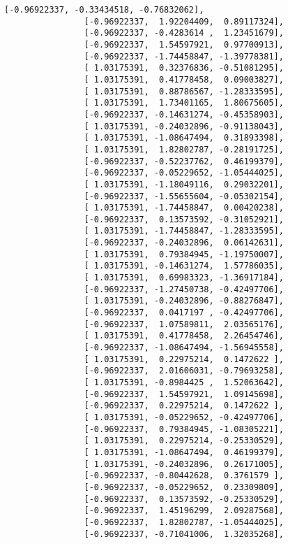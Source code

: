 \documentclass[11pt]{article}
\begin{document}
\begin{Verbatim}[commandchars=\\\{\}]
                [-0.96922337, -0.33434518, -0.76832062],
                [-0.96922337,  1.92204409,  0.89117324],
                [-0.96922337, -0.4283614 ,  1.23451679],
                [-0.96922337,  1.54597921,  0.97700913],
                [-0.96922337, -1.74458847, -1.39778381],
                [ 1.03175391,  0.32376836, -0.51081295],
                [ 1.03175391,  0.41778458,  0.09003827],
                [ 1.03175391,  0.88786567, -1.28333595],
                [ 1.03175391,  1.73401165,  1.80675605],
                [-0.96922337, -0.14631274, -0.45358903],
                [ 1.03175391, -0.24032896, -0.91138043],
                [ 1.03175391, -1.08647494,  0.31893398],
                [ 1.03175391,  1.82802787, -0.28191725],
                [-0.96922337, -0.52237762,  0.46199379],
                [-0.96922337, -0.05229652, -1.05444025],
                [ 1.03175391, -1.18049116,  0.29032201],
                [-0.96922337, -1.55655604, -0.05302154],
                [ 1.03175391, -1.74458847,  0.00420238],
                [-0.96922337,  0.13573592, -0.31052921],
                [ 1.03175391, -1.74458847, -1.28333595],
                [-0.96922337, -0.24032896,  0.06142631],
                [ 1.03175391,  0.79384945, -1.19750007],
                [ 1.03175391, -0.14631274,  1.57786035],
                [ 1.03175391,  0.69983323, -1.36917184],
                [-0.96922337, -1.27450738, -0.42497706],
                [ 1.03175391, -0.24032896, -0.88276847],
                [-0.96922337,  0.0417197 , -0.42497706],
                [-0.96922337,  1.07589811,  2.03565176],
                [ 1.03175391,  0.41778458,  2.26454746],
                [-0.96922337, -1.08647494, -1.56945558],
                [ 1.03175391,  0.22975214,  0.1472622 ],
                [-0.96922337,  2.01606031, -0.79693258],
                [ 1.03175391, -0.8984425 ,  1.52063642],
                [-0.96922337,  1.54597921,  1.09145698],
                [-0.96922337,  0.22975214,  0.1472622 ],
                [ 1.03175391, -0.05229652, -0.42497706],
                [-0.96922337,  0.79384945, -1.08305221],
                [ 1.03175391,  0.22975214, -0.25330529],
                [ 1.03175391, -1.08647494,  0.46199379],
                [ 1.03175391, -0.24032896,  0.26171005],
                [-0.96922337, -0.80442628,  0.3761579 ],
                [-0.96922337, -0.05229652,  0.23309809],
                [-0.96922337,  0.13573592, -0.25330529],
                [-0.96922337,  1.45196299,  2.09287568],
                [-0.96922337,  1.82802787, -1.05444025],
                [-0.96922337, -0.71041006,  1.32035268],

\end{Verbatim}
\end{document}
